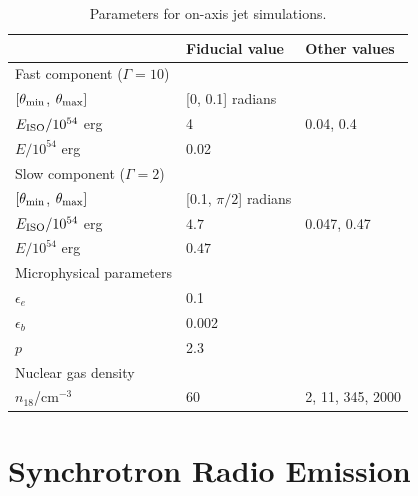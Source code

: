 \documentclass[usenatbib,fleqn]{mnras}
\begin{document}
\begin{table}
\begin{threeparttable}
  \caption{\label{tab:jetParams} Parameters for on-axis jet simulations.}
  \begin{tabular*}{0.95\columnwidth}{lll}
\hline
& Fiducial value & Other values \\
\hline\hline
    Fast component ($\Gamma=10$) &  &  \\ 
    \hline
    $[\theta_{\rm min}$, $\theta_{\rm max}]$ & [0, 0.1] radians & \\
    $E_{\rm ISO}/10^{54}$ erg & 4  & 0.04, 0.4\\
    $E/10^{54}$ erg & 0.02 & \\
    \hline 
    Slow component ($\Gamma=2$)\\
\hline
    $[\theta_{\rm min}$, $\theta_{\rm max}]$ & [0.1, $\pi/2$] radians
    & \\
    $E_{\rm ISO}/10^{54}$ erg & $4.7$ & 0.047, 0.47 \\
    $E/10^{54}$  erg & $0.47$ & \\
    \hline
    Microphysical parameters\\
\hline
    $\epsilon_e$ & 0.1 & \\
    $\epsilon_b$ & 0.002 & \\
    $p$ & 2.3\\
    \hline 
    Nuclear gas density \\
\hline
    $n_{18}$/cm$^{-3}$ & 60 & 2, 11, 345, 2000
  \end{tabular*}
\end{threeparttable}
\end{table}


\section{Synchrotron Radio Emission}

\label{sec:results}
\end{document}
